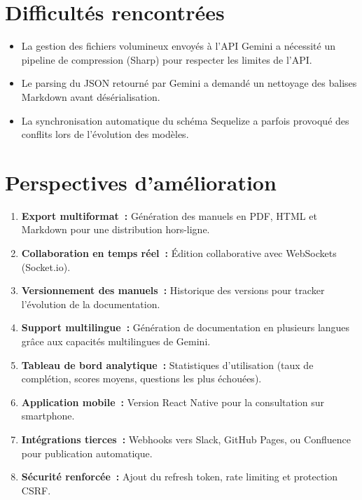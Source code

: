 \documentclass[12pt, a4paper, twoside, openany]{report}
\begin{document}
\section*{Difficult\'es rencontr\'ees}

\begin{itemize}
  \item La gestion des fichiers volumineux envoy\'es \`a l'API Gemini a n\'ecessit\'e
        un pipeline de compression (Sharp) pour respecter les limites de l'API.
  \item Le parsing du JSON retourn\'e par Gemini a demand\'e un nettoyage des
        balises Markdown avant d\'es\'erialisation.
  \item La synchronisation automatique du sch\'ema Sequelize a parfois provoqu\'e
        des conflits lors de l'\'evolution des mod\`eles.
\end{itemize}

\section*{Perspectives d'am\'elioration}

\begin{enumerate}[label=\textbf{\arabic*.}]
  \item \textbf{Export multiformat~:} G\'en\'eration des manuels en PDF, HTML et
        Markdown pour une distribution hors-ligne.
  \item \textbf{Collaboration en temps r\'eel~:} \'Edition collaborative avec
        WebSockets (Socket.io).
  \item \textbf{Versionnement des manuels~:} Historique des versions pour tracker
        l'\'evolution de la documentation.
  \item \textbf{Support multilingue~:} G\'en\'eration de documentation en plusieurs
        langues gr\^ace aux capacit\'es multilingues de Gemini.
  \item \textbf{Tableau de bord analytique~:} Statistiques d'utilisation (taux de
        compl\'etion, scores moyens, questions les plus \'echou\'ees).
  \item \textbf{Application mobile~:} Version React Native pour la consultation
        sur smartphone.
  \item \textbf{Int\'egrations tierces~:} Webhooks vers Slack, GitHub Pages, ou
        Confluence pour publication automatique.
  \item \textbf{S\'ecurit\'e renforc\'ee~:} Ajout du refresh token, rate limiting
        et protection CSRF.
\end{enumerate}
\end{document}
